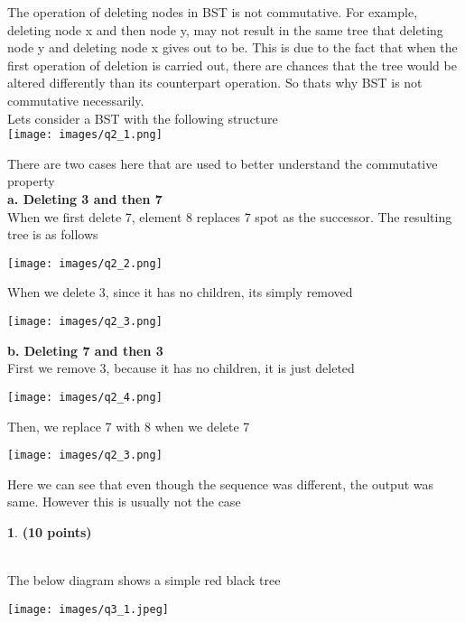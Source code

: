 \documentclass[11pt]{article}
\theoremstyle{definition}
\newtheorem{prob}{}
\newcommand{\solution}{\medskip\noindent{\color{DarkBlue}\textbf{Solution:}}}
\begin{document}
The operation of deleting nodes in BST is not commutative. For example, deleting node x and then node y, may not result in the same tree
that deleting node y and deleting node x gives out to be. This is due to the fact that when the first operation of deletion is carried out,
there are chances that the tree would be altered differently than its counterpart operation. So thats why BST is not commutative necessarily. \\

Lets consider a BST with the following structure \\

\texttt{[image: images/q2\_1.png]}

There are two cases here that are used to better understand the commutative property\\

\textbf{a. Deleting 3 and then 7} \\

When we first delete 7, element 8 replaces 7 spot as the successor. The resulting tree is as follows

\texttt{[image: images/q2\_2.png]}

When we delete 3, since it has no children, its simply removed

\texttt{[image: images/q2\_3.png]}

\textbf{b. Deleting 7 and then 3} \\

First we remove 3, because it has no children, it is just deleted

\texttt{[image: images/q2\_4.png]}

Then, we replace 7 with 8 when we delete 7

\texttt{[image: images/q2\_3.png]}

Here we can see that even though the sequence was different, the output was same. However this is usually not the case\\


\begin{prob} \textbf{(10 points)}
\end{prob}

\solution \\

The below diagram shows a simple red black tree

\texttt{[image: images/q3\_1.jpeg]}
\end{document}
